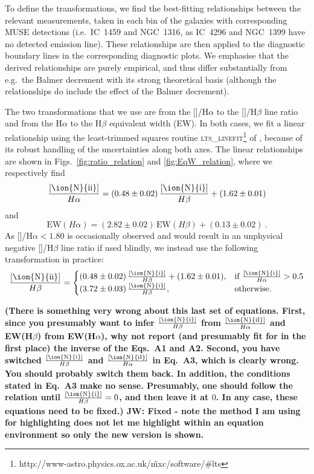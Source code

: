 \documentclass[a4paper,fleqn,usenatbib]{mnras}
\begin{document}
To define the transformations, we find the best-fitting relationships
between the relevant measurements, taken in each bin of the galaxies
with corresponding MUSE detections (i.e.\ IC~1459 and NGC~1316, as
IC~4296 and NGC~1399 have no detected emission line). These
relationships are then applied to the diagnostic boundary lines in the
corresponding diagnostic plots. We emphasise that the derived
relationships are purely empirical, and thus differ substantially from
e.g.\ the Balmer decrement with its strong theoretical basis (although
the relationships do include the effect of the Balmer decrement).

The two transformations that we use are from the
[]/H$\alpha$ to the []/H$\beta$ line ratio and
from the H$\alpha$ to the H$\beta$ equivalent width (EW). In both
cases, we fit a linear relationship using the least-trimmed squares
routine
\textsc{lts\_linefit}\footnote{http://www-astro.physics.ox.ac.uk/\~mxc/software/\#lts}
of \citet{Cappellari2013}, because of its robust handling of the
uncertainties along both axes. The linear relationships are shown in
Figs.~\ref{fig:ratio_relation} and \ref{fig:EqW_relation}, where we
respectively find
\begin{equation}
  \frac{[\text{\ion{N}{ii}}]}{H\alpha}=(0.48\pm0.02)\,\frac{[\text{\ion{N}{i}}]}{H\beta}+(1.62\pm0.01)
\end{equation}
and	
\begin{equation}
  \mathrm{EW}(H\alpha)=(2.82\pm0.02)\,\mathrm{EW}(H\beta)+(0.13\pm0.02)~.
  \label{eq:EqW_dec}
\end{equation}
As []/H$\alpha<1.80$ is occasionally observed and would
result in an unphysical negative []/H$\beta$ line ratio if
used blindly, we instead use the following transformation in practice:
\begin{equation}
  \frac{[\text{\ion{N}{ii}}]}{H\beta}= 
  \begin{cases}
    (0.48\pm0.02)\,\frac{[\text{\ion{N}{i}}]}{H\beta}+(1.62\pm0.01), & \text{if}~\frac{[\text{\ion{N}{i}}]}{H\alpha}>0.5 \\
    (3.72\pm0.03)\,\frac{[\text{\ion{N}{i}}]}{H\beta}, & \text{otherwise.}
  \end{cases}
  \label{eq:N_dec}
\end{equation}

{\bf (There is something very wrong about this last set of
  equations. First, since you presumably want to infer
  $\frac{[\text{\ion{N}{i}}]}{H\beta}$ from
  $\frac{[\text{\ion{N}{iI}}]}{H\alpha}$ and EW(H$\beta$) from
  EW(H$\alpha$), why not report (and presumably fit for in the first
  place) the inverse of the Eqs.~A1 and A2. Second, you have switched
  $\frac{[\text{\ion{N}{i}}]}{H\beta}$ and
  $\frac{[\text{\ion{N}{iI}}]}{H\alpha}$ in Eq.~A3, which is clearly
  wrong. You should probably switch them back. In addition, the
  conditions stated in Eq.~A3 make no sense. Presumably, one should
  follow the relation until $\frac{[\text{\ion{N}{i}}]}{H\beta}=0$,
  and then leave it at $0$. In any case, these equations need to be
  fixed.) JW: Fixed - note the method I am using for highlighting does not let me highlight within an equation environment so only the new version is shown.}
\end{document}
